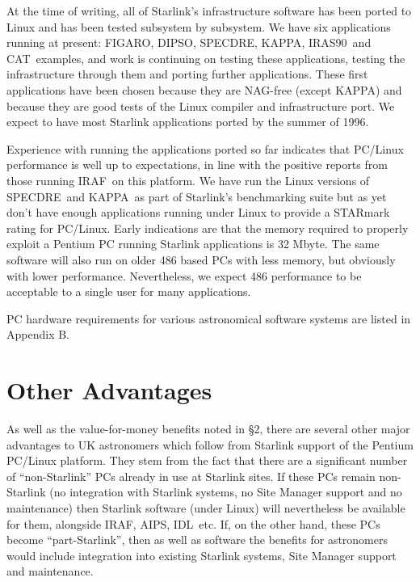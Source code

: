 \documentclass[twoside,11pt]{article}
\newcommand{\htmladdnormallink}[2]{#1}
\newcommand{\xref}[3]{#1}
\newcommand{\CAT}{{\small CAT}\normalsize}
\newcommand{\DIPSO}{{\small DIPSO}\normalsize}
\newcommand{\FIGARO}{{\small FIGARO}\normalsize}
\newcommand{\IRAS}{{\small IRAS90}\normalsize}
\newcommand{\KAPPA}{{\small KAPPA}\normalsize}
\newcommand{\SPECDRE}{{\small SPECDRE}\normalsize}
\newcommand{\CATref} {\xref{\CAT}{sun181}{START}}
\newcommand{\DIPSOref} {\xref{\DIPSO}{sun50}{}}
\newcommand{\FIGAROref}{\xref{\FIGARO}{sun86}{}}
\newcommand{\IRASref}{\xref{\IRAS}{sun163}{}}
\newcommand{\KAPPAref} {\xref{\KAPPA}{sun239}{}}
\newcommand{\AIPS}{\small{AIPS}\normalsize}
\newcommand{\AIPSref}{\htmladdnormallink{\AIPS}{http://www.aips.nrao.edu/}}
\newcommand{\IDL}{\small{IDL}\normalsize}
\newcommand{\IDLref}{\htmladdnormallink{\IDL}{http://rsinc.com/idl/}}
\newcommand{\IRAF}{\small{IRAF}\normalsize}
\newcommand{\IRAFref}{\htmladdnormallink{\IRAF}{http://iraf.noao.edu/iraf-homepage.html}}
\begin{document}
At the time of writing, all of Starlink's infrastructure software has
been ported to Linux and has been tested subsystem by subsystem.  We
have six applications running at present: \FIGAROref, \DIPSOref, 
\SPECDRE, \KAPPAref, \IRASref\ and \CATref\ examples, and work is 
continuing on testing these applications, testing
the infrastructure through them and porting further applications.
These first applications have been chosen because they
are NAG-free (except \KAPPA) and because they are good tests of the
Linux compiler and infrastructure port. We expect to have most
Starlink applications ported by the summer of 1996.

Experience with running the applications ported so far indicates that
PC/Linux performance is well up to expectations, in line with the
positive reports from those running \IRAFref\ on this platform.  We have run
the Linux versions of \SPECDRE\ and \KAPPA\ as part of Starlink's
benchmarking suite but as yet don't have enough applications running
under Linux to provide a STARmark rating for PC/Linux.  Early
indications are that the memory required to properly exploit a Pentium
PC running Starlink applications is 32 Mbyte.  The same software will
also run on older 486 based PCs with less memory, but obviously with
lower performance.  Nevertheless, we expect 486 performance to be
acceptable to a single user for many applications.

PC hardware requirements for various astronomical software systems are
listed in Appendix B. 

\section{Other Advantages}

As well as the value-for-money benefits noted in \S 2, there are
several other major advantages to UK astronomers which follow from
Starlink support of the Pentium PC/Linux platform.  They stem from the
fact that there are a significant number of ``non-Starlink'' PCs
already in use at Starlink sites.  If these PCs remain non-Starlink
(no integration with Starlink systems, no Site Manager support and no
maintenance) then Starlink software (under Linux) will nevertheless be
available for them, alongside \IRAFref, \AIPSref, \IDLref\ etc.  If, 
on the other
hand, these PCs become ``part-Starlink'', then as well as software the
benefits for astronomers would include integration into existing
Starlink systems, Site Manager support and maintenance.
\end{document}

